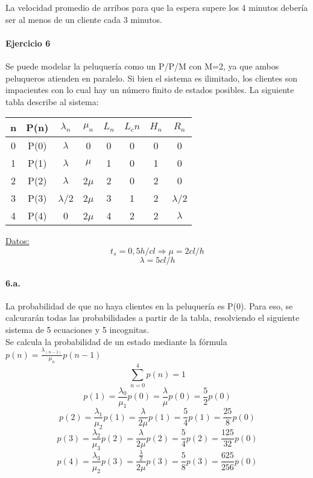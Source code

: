 \documentclass{article}
\begin{document}
    La velocidad promedio de arribos para que la espera supere los 4 minutos debería ser al menos de un cliente cada 3 minutos.
    
    
    
\paragraph{Ejercicio 6}
    Se puede modelar la peluquería como un P/P/M con M=2, ya que ambos peluqueros atienden en paralelo. Si bien el sistema es ilimitado, los clientes son impacientes con lo cual hay un número finito de estados posibles.
    La siguiente tabla describe al sistema:
    \begin{center}
    \begin{tabular}{|| c | c | c | c | c | c | c | c ||}
    \hline 
     n & P(n) & $\lambda_n$ & $\mu_n$ & $L_n$& $L_cn$ & $H_n$ & $R_n$ \\ \hline \hline
     0 & P(0) & $\lambda$   & 0       & 0    & 0      & 0     & 0	\\ \hline
     1 & P(1) & $\lambda$   & $\mu$   & 1    & 0      & 1     & 0	\\ \hline
     2 & P(2) & $\lambda$   & 2$\mu$  & 2    & 0      & 2     & 0	\\ \hline
     3 & P(3) & $\lambda$/2 & 2$\mu$  & 3    & 1      & 2     & $\lambda$/2 \\ \hline
     4 & P(4) & 0           & 2$\mu$  & 4    & 2      & 2     & $\lambda$   \\ \hline  
     
    \end{tabular}
    \end{center}
    \underline{Datos:} \\
    $$t_s = 0,5 h/cl  \Rightarrow \mu = 2 cl/h $$
    $$\lambda = 5 cl/h $$
    
    \paragraph{6.a.} La probabilidad de que no haya clientes en la peluquería es P(0). Para eso, se calcurarán todas las probabilidades a partir de la tabla,
    resolviendo el siguiente sistema de 5 ecuaciones y 5 incognitas.\\
    Se calcula la probabilidad de un estado mediante la fórmula $p(n) = \frac{\lambda_(n-1)}{\mu_n} p(n-1)$
    $$ \sum_{n=0}^{4} p(n) = 1 $$
    $$ p(1) = \frac{\lambda_0}{\mu_1}p(0) = \frac{\lambda}{\mu}p(0) = \frac{5}{2}p(0)$$
    $$ p(2) = \frac{\lambda_1}{\mu_2}p(1) = \frac{\lambda}{2\mu}p(1) = \frac{5}{4}p(1) = \frac{25}{8}p(0)$$
    $$ p(3) = \frac{\lambda_2}{\mu_3}p(2) = \frac{\lambda}{2\mu}p(2) = \frac{5}{4}p(2) = \frac{125}{32}p(0)$$
    $$ p(4) = \frac{\lambda_3}{\mu_2}p(3) = \frac{\frac{\lambda}{2}}{2\mu}p(3) = \frac{5}{8}p(3) = \frac{625}{256}p(0)$$
    
\end{document}
